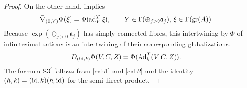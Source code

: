 \documentclass[leqno,12pt]{amsart} %
\begin{document}
\begin{proof}
  On the other hand,  implies
  \begin{equation*}
    \bar\nabla_{(0,Y)} \Phi(\xi) = \Phi(\operatorname{ad}^T_Y \xi),\qquad
    Y \in \Gamma(\oplus_{j>0}{\mathfrak a}_j),\,\xi \in \Gamma(\operatorname{\operatorname{gr}}(A)).
  \end{equation*}
  Because $\exp(\oplus_{j>0}{\mathfrak a}_j)$ has simply-connected fibres, this
  intertwining by $\Phi $ of infinitesimal actions is an intertwining of their
  corresponding globalizations:
  \begin{equation}
    \label{cab2}
    \bar D_{(\mathrm{id}, k)} \Phi(V, C, Z) = \Phi(\operatorname{Ad}^T_k(V,C, Z)).
  \end{equation}
  The formula S3$^\prime$ follows from \eqref{cab1} and \eqref{cab2} and the identity
  $(h, k) = (\mathrm{id}, k)(h, \mathrm{id})$ for the semi-direct product.
\end{proof}


\end{document}
